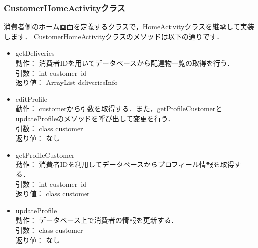 \documentclass[a4j,titlepage]{jarticle}
\begin{document}
\subsubsection{CustomerHomeActivityクラス}
消費者側のホーム画面を定義するクラスで，HomeActivityクラスを継承して実装します．
CustomerHomeActivityクラスのメソッドは以下の通りです．
  \begin{itemize}
  \item getDeliveries\\
  動作：  消費者IDを用いてデータベースから配達物一覧の取得を行う．\\
  引数：  int customer\verb|_|id\\
  返り値：  ArrayList deliveriesInfo

  \item editProfile\\
  動作：  customerから引数を取得する．また，getProfileCustomerとupdateProfileのメソッドを呼び出して変更を行う．\\
  引数：  class customer\\
  返り値：  なし

  \item getProfileCustomer\\
  動作：  消費者IDを利用してデータベースからプロフィール情報を取得する．\\
  引数：  int customer\verb|_|id\\
  返り値：  class customer

  \item updateProfile\\
  動作：  データベース上で消費者の情報を更新する．\\
  引数：  class customer\\
  返り値：  なし
\end{itemize}
\end{document}
